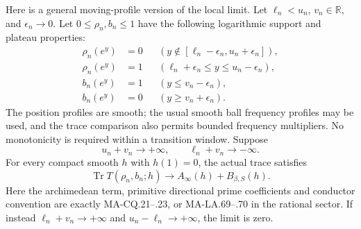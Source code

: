 Here is a general moving-profile version of the local limit.
Let \(\ell_n<u_n\), \(v_n\in\mathbb R\), and
\(\epsilon_n\to0\).  Let \(0\le\rho_n,b_n\le1\)
have the following logarithmic support and plateau properties:
\[
 \begin{aligned}
 \rho_n(e^y)&=0&&
       (y\notin[\ell_n-\epsilon_n,u_n+\epsilon_n]),\\
 \rho_n(e^y)&=1&&
       (\ell_n+\epsilon_n\le y\le u_n-\epsilon_n),\\
 b_n(e^y)&=1&&(y\le v_n-\epsilon_n),\\
 b_n(e^y)&=0&&(y\ge v_n+\epsilon_n).
 \end{aligned}
 \tag{MA-LA.83}
\]
The position profiles are smooth; the usual smooth ball
frequency profiles may be used, and the trace comparison
also permits bounded frequency multipliers.
No monotonicity is required within a transition window.
Suppose
\[
                u_n+v_n\longrightarrow+\infty,\qquad
                \ell_n+v_n\longrightarrow-\infty .
 \tag{MA-LA.84}
\]
For every compact smooth \(h\) with \(h(1)=0\), the actual
trace satisfies
\[
       \operatorname{Tr}T(\rho_n,b_n;h)
            \longrightarrow A_\infty(h)+B_{\beta,S}(h).
 \tag{MA-LA.85}
\]
Here the archimedean term, primitive directional prime
coefficients and conductor convention are exactly
MA-CQ.21--.23, or MA-LA.69--.70 in the rational sector.
If instead \(\ell_n+v_n\to+\infty\) and
\(u_n-\ell_n\to+\infty\), the limit is zero.

